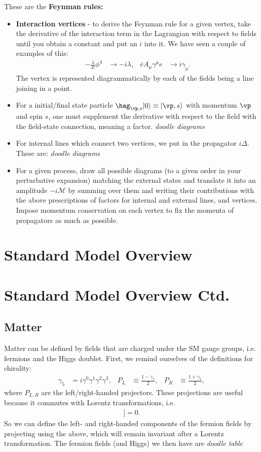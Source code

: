 \documentclass[relqm.tex]{subfiles}
\begin{document}
These are the \textbf{Feynman rules:}
\begin{itemize}
    \item \textbf{Interaction vertices} - to derive the Feynman rule for a given vertex, take the derivative of the interaction term in the Lagrangian with respect to fields until you obtain a constant and put an $i$ into it. 
        We have seen a couple of examples of this:
        \begin{align}
            -\frac{\lambda}{4!}\phi^4 &\to -i\lambda, & \bar{e}A_\mu\gamma^\mu e &\to i\gamma_\mu.
        \end{align}
        The vertex is represented diagrammatically by each of the fields being a line joining in a point. 
    \item For a initial/final state particle $\hag_{\vp,s}|0\rangle \equiv |\vp,s\rangle$ with momentum $\vp$ and spin $s$, one must supplement the derivative with respect to the field with the field-state connection, meaning a factor.
        \emph{doodle diagrams}
    \item For internal lines which connect two vertices, we put in the propagator $i\Delta$.
        These are:
        \emph{doodle diagrams}
    \item For a given process, draw all possible diagrams (to a given order in your perturbative expansion) matching the external states and translate it into an amplitude $-i\mathcal{M}$ by summing over them and writing their contributions with the above prescriptions of factors for internal and external lines, and vertices.
        Impose momentum conservation on each vertex to fix the momenta of propagators as much as possible.
\end{itemize}

\chapter{Standard Model Overview}

\chapter{Standard Model Overview Ctd.}
\section{Matter}
Matter can be defined by fields that are charged under the SM gauge groups, i.e. fermions and the Higgs doublet. 
First, we remind ourselves of the definitions for chirality:
\begin{align}
    \gamma_5 &= i\gamma^0\gamma^1\gamma^2\gamma^3, & P_L &\equiv\frac{1-\gamma_5}{2}, & P_R &\equiv \frac{1+\gamma_5}{2},
\end{align}
where $P_{L,R}$ are the left/right-handed projectors. 
These projections are useful because it commutes with Lorentz transformations, i.e.
\begin{align}
    [\gamma_5,[\gamma_\mu,\gamma_\nu]] = 0.
\end{align}
So we can define the left- and right-handed components of the fermion fields by projecting using the above, which will remain invariant after a Lorentz transformation. 
The fermion fields (and Higgs) we then have are
\emph{doodle table}
\end{document}
